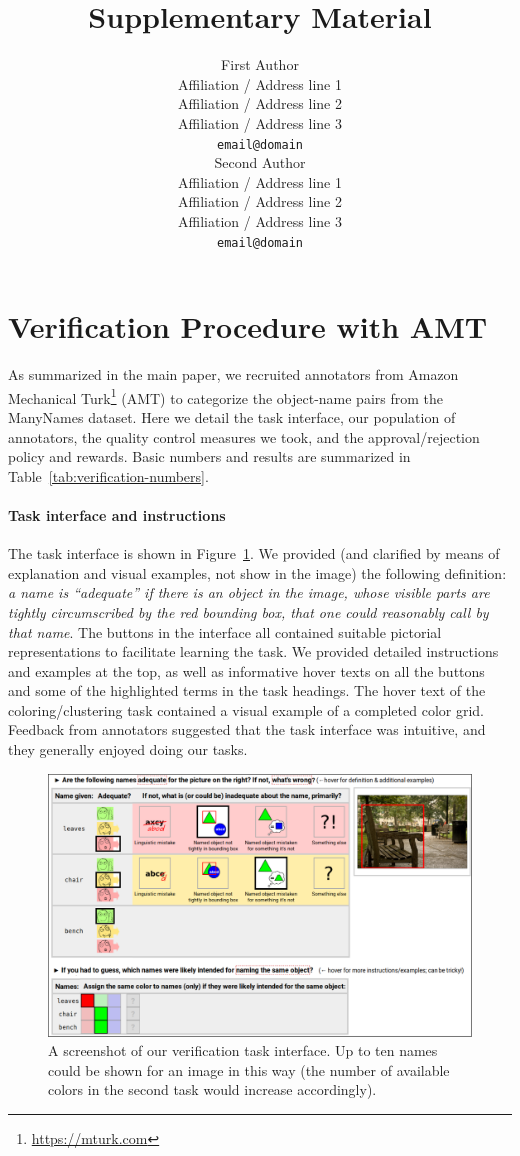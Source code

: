 \documentclass[11pt,a4paper]{article}
\title{Supplementary Material}
\author{First Author \\
	Affiliation / Address line 1 \\
	Affiliation / Address line 2 \\
	Affiliation / Address line 3 \\
	\texttt{email@domain} \\\And
	Second Author \\
	Affiliation / Address line 1 \\
	Affiliation / Address line 2 \\
	Affiliation / Address line 3 \\
	\texttt{email@domain} \\}
\date{}
\newcommand{\mn}{ManyNames\xspace}
\begin{document}
\section{Verification Procedure with AMT}
\label{sec:verif}
As summarized in the main paper, we recruited annotators from Amazon Mechanical Turk\footnote{
	\url{https://mturk.com}
} (AMT) to categorize the object-name pairs from the \mn dataset.
Here we detail the task interface, our population of annotators, the quality control measures we took, and the approval/rejection policy and rewards.
Basic numbers and results are summarized in Table~\ref{tab:verification-numbers}.

\paragraph{Task interface and instructions}
The task interface is shown in Figure~\ref{fig:verification-interface}.
We provided (and clarified by means of explanation and visual examples, not show in the image) the following definition: \textit{a name is ``adequate'' if there is an object in the image, whose visible parts are tightly circumscribed by the red bounding box, that one could reasonably call by that name}.
The buttons in the interface all contained suitable pictorial representations to facilitate learning the task.
We provided detailed instructions and examples at the top, as well as informative hover texts on all the buttons and some of the highlighted terms in the task headings.
The hover text of the coloring/clustering task contained a visual example of a completed color grid.
Feedback from annotators suggested that the task interface was intuitive, and they generally enjoyed doing our tasks.
\begin{figure}[t]
	\centering
	\includegraphics[width=\textwidth]{images/verification-interface.pdf}
	\caption{A screenshot of our verification task interface. Up to ten names could be shown for an image in this way (the number of available colors in the second task would increase accordingly).}
	\label{fig:verification-interface}
\end{figure}
\end{document}
